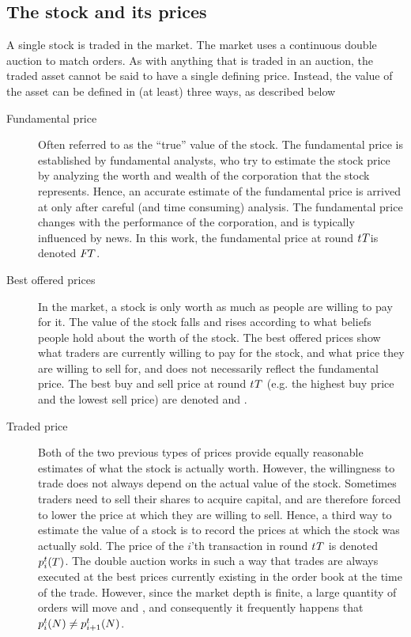 \subsection{The stock and its prices}\label{section:stock_and_prices}
A single stock is traded in the market. The market uses a continuous double auction to match orders. As with anything that is traded in an auction, the traded asset cannot be said to have a single defining price. Instead, the value of the asset can be defined in (at least) three ways, as described below

\begin{description}
\item[Fundamental price] Often referred to as the ``true'' value of the stock. The fundamental price is established by fundamental analysts, who try to estimate the stock price by analyzing the worth and wealth of the corporation that the stock represents. Hence, an accurate estimate of the fundamental price is arrived at only after careful (and time consuming) analysis. The fundamental price changes with the performance of the corporation, and is typically influenced by news. In this work, the fundamental price at round $\round{T}$is denoted $\fundamentalprice{T}$.
\item[Best offered prices] In the market, a stock is only worth as much as people are willing to pay for it. The value of the stock falls and rises according to what beliefs people hold about the worth of the stock. The best offered prices show what traders are currently willing to pay for the stock, and what price they are willing to sell for, and does not necessarily reflect the fundamental price. The best buy and sell price at round $\round{T}$ (e.g. the highest buy price and the lowest sell price) are denoted  and .
\item[Traded price] Both of the two previous types of prices provide equally reasonable estimates of what the stock is actually worth. However, the willingness to trade does not always depend on the actual value of the stock. Sometimes traders need to sell their shares to acquire capital, and are therefore forced to lower the price at which they are willing to sell. Hence, a third way to estimate the value of a stock is to record the prices at which the stock was actually sold. The price of the $i$'th transaction in round $\round{T}$ is denoted $\tradeprice{T}{i}$. The double auction works in such a way that trades are always executed at the best prices currently existing in the order book at the time of the trade. However, since the market depth is finite, a large quantity of orders will move  and , and consequently it frequently happens that $\tradeprice{N}{i} \neq \tradeprice{N}{i+1}$.
\end{description}

